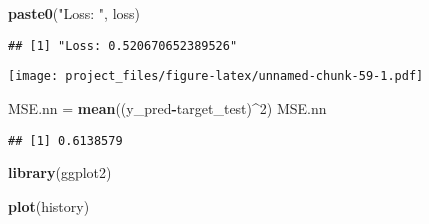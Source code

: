 \documentclass[
]{article}
\newenvironment{Shaded}{\begin{snugshade}}{\end{snugshade}}
\newcommand{\DataTypeTok}[1]{\textcolor[rgb]{0.13,0.29,0.53}{#1}}
\newcommand{\DecValTok}[1]{\textcolor[rgb]{0.00,0.00,0.81}{#1}}
\newcommand{\FloatTok}[1]{\textcolor[rgb]{0.00,0.00,0.81}{#1}}
\newcommand{\KeywordTok}[1]{\textcolor[rgb]{0.13,0.29,0.53}{\textbf{#1}}}
\newcommand{\NormalTok}[1]{#1}
\newcommand{\OperatorTok}[1]{\textcolor[rgb]{0.81,0.36,0.00}{\textbf{#1}}}
\newcommand{\StringTok}[1]{\textcolor[rgb]{0.31,0.60,0.02}{#1}}
\begin{document}
\begin{Shaded}
\begin{Highlighting}[]
\KeywordTok{paste0}\NormalTok{(}\StringTok{"Loss: "}\NormalTok{, loss)}
\end{Highlighting}
\end{Shaded}

\begin{verbatim}
## [1] "Loss: 0.520670652389526"
\end{verbatim}

\begin{Shaded}
\end{Shaded}

\texttt{[image: project\_files/figure-latex/unnamed-chunk-59-1.pdf]}

\begin{Shaded}
\begin{Highlighting}[]
\NormalTok{MSE.nn =}\StringTok{ }\KeywordTok{mean}\NormalTok{((y_pred}\OperatorTok{-}\NormalTok{target_test)}\OperatorTok{^}\DecValTok{2}\NormalTok{)}
\NormalTok{MSE.nn}
\end{Highlighting}
\end{Shaded}

\begin{verbatim}
## [1] 0.6138579
\end{verbatim}

\begin{Shaded}
\begin{Highlighting}[]
\KeywordTok{library}\NormalTok{(ggplot2)}

\KeywordTok{plot}\NormalTok{(history)}
\end{Highlighting}
\end{Shaded}
\end{document}
